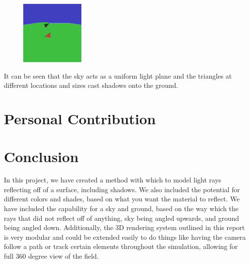 \documentclass{article}
\begin{document}
\begin{multicols}{2}
\begin{figure}
\centering
\includegraphics[width=\linewidth]{./imgs/output4}
\caption{}
\label{fig:output4}
\end{figure}

\end{multicols}

It can be seen that the sky acts as a uniform light plane and the triangles at different locations and sizes cast shadows
onto the ground.

\section{Personal Contribution}

\section{Conclusion}
In this project, we have created a method with which to model light rays reflecting off of a surface, including shadows. We also
included the potential for different colors and shades, based on what you want the material to reflect. We have included the capability
for a sky and ground, based on the way which the rays that did not reflect off of anything, sky being angled upwards, and ground
being angled down. Additionally, the 3D rendering system outlined in this report is very modular and could be extended easily to
do things like having the camera follow a path or track certain elements throughout the simulation, allowing for full 360 degree
view of the field.
\end{document}

